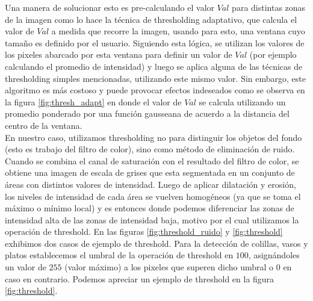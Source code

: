 Una manera de solucionar esto es pre-calculando el valor $Val$ para 
distintas zonas de la imagen como lo hace la 
t\'ecnica de thresholding adaptativo, que calcula el valor de $Val$ a 
medida que recorre la imagen, usando para esto, una ventana cuyo 
tama\~no es definido por el usuario. Siguiendo esta l\'ogica, se utilizan 
los valores de los pixeles abarcado por esta ventana para definir un valor 
de $Val$ (por ejemplo calculando el promedio de intensidad) y luego se 
aplica alguna de las t\'ecnicas de thresholding simples mencionadas, 
utilizando este mismo valor. Sin embargo, este algoritmo es m\'as 
costoso y puede provocar efectos indeseados como se observa en la 
figura \ref{fig:thresh_adapt} en donde el valor de $Val$ se calcula 
utilizando un promedio ponderado por una funci\'on gausseana de acuerdo a la distancia del centro 
de la ventana.\\
\indent En nuestro caso, utilizamos thresholding no para distinguir los 
objetos del fondo (esto es trabajo del filtro de color), sino como 
m\'etodo de eliminaci\'on de ruido. Cuando se combina el canal de 
saturaci\'on con el resultado del filtro de color, se obtiene una imagen 
de escala de grises que esta segmentada en un conjunto de \'areas con 
distintos valores de intensidad. Luego de aplicar dilataci\'on y 
erosi\'on, los niveles de intensidad de cada \'area se vuelven 
homog\'eneos (ya que se toma el m\'aximo o m\'inimo local) y es entonces 
donde podemos diferenciar las zonas de intensidad alta de las zonas de 
intensidad baja, motivo por el cual utilizamos la operaci\'on de 
threshold. En las figuras \ref{fig:threshold_ruido} y 
\ref{fig:threshold} exhibimos dos casos de ejemplo de threshold. 
Para la detecci\'on de colillas, vasos y platos establecemos 
el umbral de la operaci\'on de threshold en $100$, asign\'andoles un valor 
de $255$ (valor m\'aximo) a los pixeles que superen dicho umbral o $0$ en 
caso en contrario. Podemos apreciar un ejemplo de threshold en la 
figura \ref{fig:threshold}.

